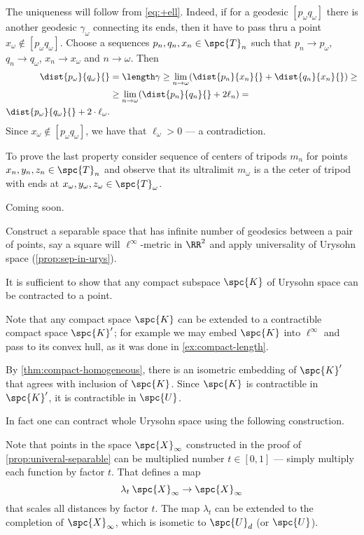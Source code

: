 The uniqueness will follow from \ref{eq:+ell}.
Indeed, if for a geodesic $[p_\omega q_\omega]$ there is another geodesic $\gamma_\omega$ connecting its ends,
then it have to pass thru a point $x_\omega\notin [p_\omega q_\omega]$.
Choose a sequences $p_n,q_n,x_n\in\spc{T}_n$ such that $p_n\to p_\omega$, $q_n\to q_\omega$, $x_n\to x_\omega$ and $n\to\omega$.
Then 
\begin{align*}
\dist{p_\omega}{q_\omega}{}&=\length\gamma\ge \lim_{n\to\omega}(\dist{p_n}{x_n}{}+\dist{q_n}{x_n}{})\ge
\\
&\ge \lim_{n\to\omega}(\dist{p_n}{q_n}{}+2\ell_n)=
\\
\dist{p_\omega}{q_\omega}{}+2\cdot\ell_\omega.
\end{align*}
Since $x_\omega\notin [p_\omega q_\omega]$, we have that $\ell_\omega>0$ --- a contradiction.

To prove the last property consider sequence of centers of tripods $m_n$ for points $x_n,y_n,z_n\in \spc{T}_n$ and observe that its ultralimit $m_\omega$ is a the ceter of tripod with ends at $x_\omega,y_\omega,z_\omega\in \spc{T}_\omega$.

 Coming soon. %

Construct a separable space that has infinite number of geodesics between a pair of points, say a square will $\ell^\infty$-metric in $\RR^2$ and apply universality of Urysohn space (\ref{prop:sep-in-urys}).

It is sufficient to show that any compact subspace $\spc{K}$ of Urysohn space can be contracted to a point.

Note that any compact space $\spc{K}$ can be extended to a contractible compact space $\spc{K}'$; for example we may embed $\spc{K}$ into $\ell^\infty$ and pass to its convex hull, as it was done in \ref{ex:compact-length}.

By \ref{thm:compact-homogeneous}, there is an isometric embedding of $\spc{K}'$ that agrees with inclusion of $\spc{K}$.
Since $\spc{K}$ is contractible in $\spc{K}'$, it is contractible in $\spc{U}$.

\medskip

In fact one can contract whole Urysohn space using the following construction.

Note that points in the space $\spc{X}_\infty$ constructed in the proof of \ref{prop:univeral-separable} can be multiplied number $t\in [0,1]$ --- simply multiply each function by factor $t$.
That defines a map 
\[\lambda_t\:\spc{X}_\infty\to \spc{X}_\infty\]
that scales all distances by factor $t$.
The map $\lambda_t$ can be extended to the completion of $\spc{X}_\infty$, which is isometic to $\spc{U}_d$ (or $\spc{U}$).

